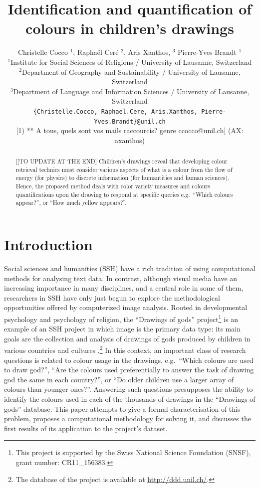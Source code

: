 \documentclass[11pt,a4paper]{article}
\title{Identification and quantification of colours in children's drawings}
\author{Christelle Cocco ${}^1$, Rapha\"el Cer\'e ${}^2$, Aris Xanthos, ${}^3$  Pierre-Yves Brandt ${}^1$\\
  ${}^1$Institute for Social Sciences of Religions / University of Lausanne, Switzerland \\
  ${}^2$Department of Geography and Sustainability / University of Lausanne, Switzerland \\
  ${}^3$Department of Language and Information Sciences / University of Lausanne, Switzerland \\
  {\tt \{Christelle.Cocco, Raphael.Cere, Aris.Xanthos, Pierre-Yves.Brandt\}@unil.ch} \\
  {\color{red} [1) ** A tous, quels sont vos mails raccourcis? genre ccocco@unil.ch] (AX: axanthos)}
  }
\date{}
\begin{document}
\maketitle
\begin{abstract}
{\color{red}[[TO UPDATE AT THE END]}
{\color{gray}Children's drawings reveal that developing colour retrieval technics
must consider various aspects of what is a colour from the flow of
energy (for physics) to discrete information (for humantities and human
sciences). Hence, the proposed method deals with color variety measures
and colours quantifications upon the drawing to respond at specific
queries e.g.~``Which colours appear?'', or ``How much yellow appears?''.}
\end{abstract}


\section{Introduction}\label{introduction}
\label{sec:introduction}

Social sciences and humanities (SSH) have a rich tradition of using computational methods for analysing text data. In contrast, although visual media have an increasing importance in many disciplines, and a central role in some of them, researchers in SSH have only just begun to explore the methodological opportunities offered by computerized image analysis. Rooted in developmental psychology and psychology of religion, the ``Drawings of gods'' project\footnote{This project is supported by the Swiss National Science Foundation (SNSF), grant number: CR11\_156383.} is an example of an SSH project in which image is the primary data type: its main goals are the collection and analysis of drawings of gods produced by children in various countries and cultures \cite[see e.g.][]{BrandtKagataSpittelerGillieronPaleologue2009,Dandarova2013,DandarovaRobertDessartSerbaevaEtAl2016}.\footnote{The database of the project is available at \url{http://ddd.unil.ch/}.} In this context, an important class of research questions is related to colour usage in the drawings, e.g.~``Which colours are used to draw god?'', ``Are the colours used preferentially to answer the task of drawing god the same in each country?'', or ``Do older children use a larger array of colours than younger ones?''. Answering such questions presupposes the ability to identify the colours used in each of the thousands of drawings in the ``Drawings of gods'' database. This paper attempts to give a formal characterisation of this problem, proposes a computational methodology for solving it, and discusses the first results of its application to the project's dataset.
\end{document}
